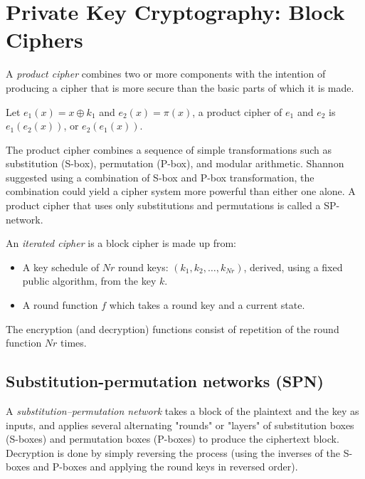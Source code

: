\section{Private Key Cryptography: Block Ciphers}
\begin{definition}
    A \textit{product cipher} combines two or more components with the intention of producing a cipher that is more secure than the basic parts of which it is made.
\end{definition}
\begin{example}
    Let $e_1(x) = x \oplus k_1$ and $e_2(x) = \pi(x)$,
    a product cipher of $e_1$ and $e_2$ is $e_1(e_2(x))$, or $e_2(e_1(x))$.
\end{example}

The product cipher combines a sequence of simple
transformations such as substitution (S-box),
permutation (P-box),
and modular arithmetic.
Shannon suggested using a combination of S-box and P-box transformation,
the combination could yield a cipher system more powerful than either one alone.
A product cipher that uses only substitutions and permutations is called a SP-network.

\begin{definition}
    An \textit{iterated cipher} is a block cipher is made up from:
    \begin{itemize}
        \item A key schedule of $Nr$ round keys: $(k_1, k_2, \dots, k_{Nr})$, derived, using a fixed public algorithm, from the key $k$.
        \item A round function $f$ which takes a round key and a current state.
    \end{itemize}
    The encryption (and decryption) functions consist of repetition of the round function $Nr$ times.
\end{definition}

\subsection{Substitution-permutation networks (SPN)}
\begin{definition}
    A \textit{substitution–permutation network}
    takes a block of the plaintext and the key as inputs,
    and applies several alternating "rounds" or "layers" of
    substitution boxes (S-boxes) and permutation boxes (P-boxes)
    to produce the ciphertext block.\\

    Decryption is done by simply reversing the process
    (using the inverses of the S-boxes and P-boxes and applying the round keys in reversed order).
\end{definition}

